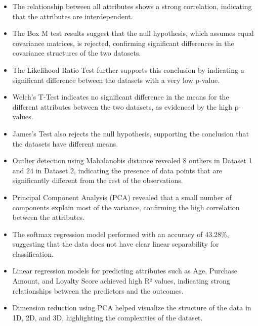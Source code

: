 \documentclass[11pt]{article}
\begin{document}
\begin{itemize}
    \item The relationship between all attributes shows a strong correlation, indicating that the attributes are interdependent.
    \item The Box M test results suggest that the null hypothesis, which assumes equal covariance matrices, is rejected, confirming significant differences in the covariance structures of the two datasets.
    \item The Likelihood Ratio Test further supports this conclusion by indicating a significant difference between the datasets with a very low p-value.
    \item Welch's T-Test indicates no significant difference in the means for the different attributes between the two datasets, as evidenced by the high p-values.
    \item James's Test also rejects the null hypothesis, supporting the conclusion that the datasets have different means.
    \item Outlier detection using Mahalanobis distance revealed 8 outliers in Dataset 1 and 24 in Dataset 2, indicating the presence of data points that are significantly different from the rest of the observations.
    \item Principal Component Analysis (PCA) revealed that a small number of components explain most of the variance, confirming the high correlation between the attributes.
    \item The softmax regression model performed with an accuracy of 43.28\%, suggesting that the data does not have clear linear separability for classification.
    \item Linear regression models for predicting attributes such as Age, Purchase Amount, and Loyalty Score achieved high R² values, indicating strong relationships between the predictors and the outcomes.
    \item Dimension reduction using PCA helped visualize the structure of the data in 1D, 2D, and 3D, highlighting the complexities of the dataset.
\end{itemize}
\end{document}
